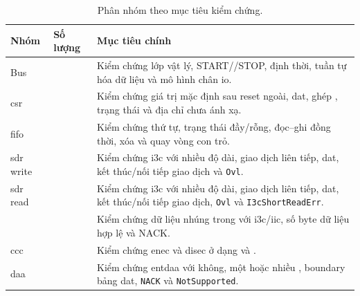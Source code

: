 \begin{table}[!htbp]
	\centering
	\caption{Phân nhóm \VirtualSequence{} theo mục tiêu kiểm chứng.}
	\label{tab:vseq-cat}
	\begin{tabular}{L{3.0cm} C{1.6cm} L{8.5cm}}
		\toprule
		\textbf{Nhóm}                      & \textbf{Số lượng}             & \textbf{Mục tiêu chính}                                                                                                                                      \\
		\midrule
		Bus                                & \BusVseqCount{}               & Kiểm chứng lớp vật lý, START/\RepeatedSTART{}/STOP, định thời, tuần tự hóa dữ liệu và mô hình chân \gls{io}.                                                 \\
		\gls{csr}                          & \CsrVseqCount{}               & Kiểm chứng giá trị mặc định sau reset ngoài, \gls{dat}, ghép \CommandDescriptor{}, trạng thái và địa chỉ chưa ánh xạ.                                        \\
		\gls{fifo}                         & \FifoVseqCount{}              & Kiểm chứng thứ tự, trạng thái đầy/rỗng, đọc--ghi đồng thời, xóa và quay vòng con trỏ.                                                                        \\
		\gls{sdr} write                    & \SdrWriteVseqCount{}          & Kiểm chứng \gls{i3c} \PrivateWrite{} với nhiều độ dài, giao dịch liên tiếp, \gls{dat}, kết thúc/nối tiếp giao dịch và \texttt{Ovl}.                          \\
		\gls{sdr} read                     & \SdrReadVseqCount{}           & Kiểm chứng \gls{i3c} \PrivateRead{} với nhiều độ dài, giao dịch liên tiếp, \gls{dat}, kết thúc/nối tiếp giao dịch, \texttt{Ovl} và \texttt{I3cShortReadErr}. \\
		\ImmediateDataTransfer{}           & \ImmediateVseqCount{}         & Kiểm chứng dữ liệu nhúng trong \CommandDescriptor{} với \gls{i3c}/\gls{iic}, số byte dữ liệu hợp lệ và NACK.                                                 \\
		\gls{ccc}                          & \CccVseqCount{}               & Kiểm chứng \gls{enec} và \gls{disec} ở dạng \BroadcastCCC{} và \DirectCCC{}.                                                                                 \\
		\gls{daa}                          & \DaaVseqCount{}               & Kiểm chứng \gls{entdaa} với không, một hoặc nhiều \Target{}, boundary bảng \gls{dat}, \texttt{NACK} và \texttt{NotSupported}.                                \\

\end{tabular}
\end{table}
